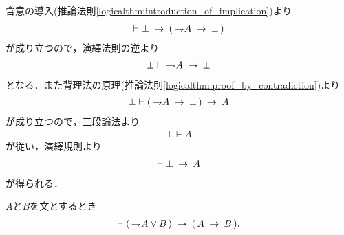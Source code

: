 	\begin{prf}
		含意の導入(推論法則\ref{logicalthm:introduction_of_implication})より
		\begin{align}
			\vdash \bot \hspace{0.25em}\rightarrow\hspace{0.25em} (\, \rightharpoondown\hspace{-0.25em} A \hspace{0.25em}\rightarrow\hspace{0.25em} \bot\, )
		\end{align}
		が成り立つので，演繹法則の逆より
		\begin{align}
			\bot \vdash\ \rightharpoondown\hspace{-0.25em} A \hspace{0.25em}\rightarrow\hspace{0.25em} \bot
		\end{align}
		となる．また背理法の原理(推論法則\ref{logicalthm:proof_by_contradiction})より
		\begin{align}
			\bot \vdash (\, \rightharpoondown\hspace{-0.25em} A \hspace{0.25em}\rightarrow\hspace{0.25em} \bot\, ) \hspace{0.25em}\rightarrow\hspace{0.25em} A
		\end{align}
		が成り立つので，三段論法より
		\begin{align}
			\bot \vdash A
		\end{align}
		が従い，演繹規則より
		\begin{align}
			\vdash \bot \hspace{0.25em}\rightarrow\hspace{0.25em} A
		\end{align}
		が得られる．
		\QED
	\end{prf}
	
	\begin{screen}
		\begin{logicalthm}[否定の論理和は含意で書ける]
		\label{logicalthm:disjunction_of_negation_rewritable_by_implication}
			$A$と$B$を文とするとき
			\begin{align}
				\vdash (\, \rightharpoondown\hspace{-0.25em} A \vee B\, ) \hspace{0.25em}\rightarrow\hspace{0.25em} (\, A \hspace{0.25em}\rightarrow\hspace{0.25em} B\, ).
			\end{align}
		\end{logicalthm}
	\end{screen}
	
